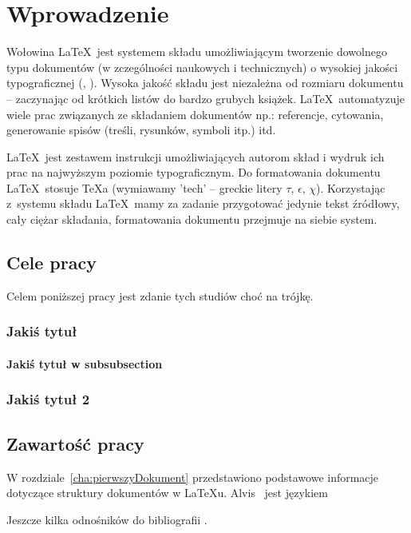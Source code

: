 \chapter{Wprowadzenie}
\label{cha:wprowadzenie}

Wołowina \LaTeX~jest systemem składu umożliwiającym tworzenie dowolnego typu dokumentów (w zczególności naukowych i technicznych) o wysokiej jakości typograficznej (\cite{Dil00}, \cite{Lam92}). Wysoka jakość składu jest niezależna od rozmiaru dokumentu -- zaczynając od krótkich listów do bardzo grubych książek. \LaTeX~automatyzuje wiele prac związanych ze składaniem dokumentów np.: referencje, cytowania, generowanie spisów (treśli, rysunków, symboli itp.) itd.

\LaTeX~jest zestawem instrukcji umożliwiających autorom skład i wydruk ich prac na najwyższym poziomie typograficznym. Do formatowania dokumentu \LaTeX~stosuje \TeX a (wymiawamy 'tech' -- greckie litery $\tau$, $\epsilon$, $\chi$). Korzystając z~systemu składu \LaTeX~mamy za zadanie przygotować jedynie tekst źródłowy, cały ciężar składania, formatowania dokumentu przejmuje na siebie system.


\section{Cele pracy}
\label{sec:celePracy}


Celem poniższej pracy jest zdanie tych studiów choć na trójkę.

\subsection{Jakiś tytuł}

\subsubsection{Jakiś tytuł w subsubsection}


\subsection{Jakiś tytuł 2}


\section{Zawartość pracy}
\label{sec:zawartoscPracy}

W rozdziale~\ref{cha:pierwszyDokument} przedstawiono podstawowe informacje dotyczące struktury dokumentów w \LaTeX u. Alvis~\cite{Alvis2011} jest językiem\textellipsis

Jeszcze kilka odnośników do bibliografii \cite{PeDa04,BuDo03}.